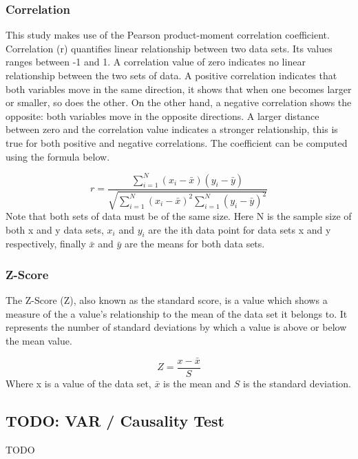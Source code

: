 \subsubsection{Correlation}

This study makes use of the Pearson product-moment correlation coefficient. Correlation (r) quantifies linear relationship between two data sets. Its values ranges between -1 and 1. A correlation value of zero indicates no linear relationship between the two sets of data. A positive correlation indicates that both variables move in the same direction, it shows that when one becomes larger or smaller, so does the other. On the other hand, a negative correlation shows the opposite: both variables move in the opposite directions. 
A larger distance between zero and the correlation value indicates a stronger relationship, this is true for both positive and negative correlations. The coefficient can be computed using the formula below.

\begin{equation}
    r = \frac{\sum_{i=1}^{N}(x_{i} - \bar{x})(y_{i} - \bar{y})}{\sqrt{\sum_{i=1}^{N}(x_{i} - \bar{x})^{2}\sum_{i=1}^{N}(y_{i} - \bar{y})^{2}}}
\end{equation}
Note that both sets of data must be of the same size. Here N is the sample size of both x and y data sets, $x_{i}$ and $y_{i}$ are the ith data point for data sets x and y respectively, finally $\bar{x}$ and $\bar{y}$ are the means for both data sets.

\subsubsection{Z-Score}

The Z-Score (Z), also known as the standard score, is a value which shows a measure of the a value's relationship to the mean of the data set it belongs to. It represents the number of standard deviations by which a value is above or below the mean value.

\begin{equation}
    Z = \frac{x - \bar{x}}{S}
\end{equation}
Where x is a value of the data set, $\bar{x}$ is the mean and $S$ is the standard deviation.

\subsection{TODO: VAR / Causality Test}
TODO
